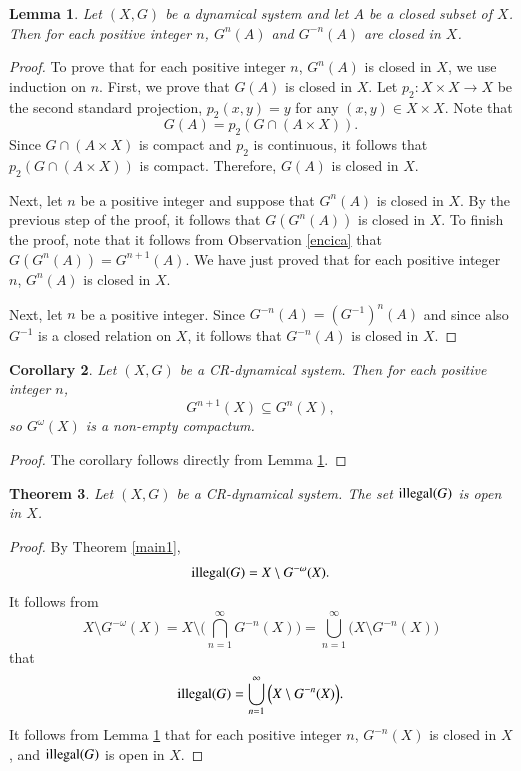 \documentclass[a4paper,12pt]{article} %
\newcommand{\illegal}{\textup{illegal}}
\newtheorem{theorem}{Theorem}[section]
\newtheorem{lemma}[theorem]{Lemma}
\newtheorem{corollary}[theorem]{Corollary}
\begin{document}
%
\begin{lemma}\label{closed1}
Let $(X,G)$ be a dynamical system  and let $A$ be a closed subset of $X$. Then for each positive integer $n$, $G^n(A)$ and $G^{-n}(A)$ are closed in $X$. 
\end{lemma}
\begin{proof}
To prove that for each positive integer $n$, $G^n(A)$ is closed in $X$, we use induction on $n$.  First, we prove that $G(A)$ is closed in $X$.  Let $p_2:X\times X\rightarrow X$ be the second standard projection, $p_2(x,y)=y$ for any $(x,y)\in X\times X$.  Note that 
$$
G(A)=p_2(G\cap (A\times X)).
$$ 
Since $G\cap (A\times X)$ is compact and $p_2$ is continuous, it follows that $p_2(G\cap (A\times X))$ is compact. Therefore, $G(A)$ is closed in $X$.

Next, let $n$ be a positive integer and suppose that $G^n(A)$ is closed in $X$.  By the previous step of the proof,  it follows that $G(G^n(A))$ is closed in $X$.  To finish the proof, note that it follows from Observation \ref{encica} that $G(G^n(A))=G^{n+1}(A)$.
We have just proved that for each positive integer $n$, $G^n(A)$ is closed in $X$. 

Next, let $n$ be a positive integer.  Since $G^{-n}(A)=(G^{-1})^n(A)$ and since also $G^{-1}$ is a closed relation on $X$, it follows that $G^{-n}(A)$ is closed in $X$.
\end{proof}
\begin{corollary}
Let $(X,G)$ be a CR-dynamical system.  Then for each positive integer $n$, 
$$
G^{n+1}(X)\subseteq G^n(X),
$$
so $G^{\omega}(X)$ is a non-empty compactum.
\end{corollary}\begin{proof}
The corollary follows directly from Lemma \ref{closed1}.
\end{proof}
\begin{theorem}\label{illegal_open}
Let $(X,G)$ be a CR-dynamical system.  The set $\illegal(G)$ is open in $X$.
\end{theorem}
\begin{proof}
By Theorem \ref{main1}, 
$$
\illegal(G)=X\setminus G^{-\omega}(X).
$$
It follows from
$$
X\setminus G^{-\omega}(X)=X\setminus \Big(\bigcap_{n=1}^{\infty} G^{-n}(X)\Big)=\bigcup_{n=1}^{\infty}\Big(X\setminus G^{-n}(X)\Big)
$$
that 
$$
\illegal(G)=\bigcup_{n=1}^{\infty}\Big(X\setminus G^{-n}(X)\Big).
$$
It follows from  Lemma \ref{closed1} that for each positive integer $n$,  $G^{-n}(X)$ is closed in $X$,  and  $\illegal(G)$ is open in $X$.
\end{proof}
\end{document}
